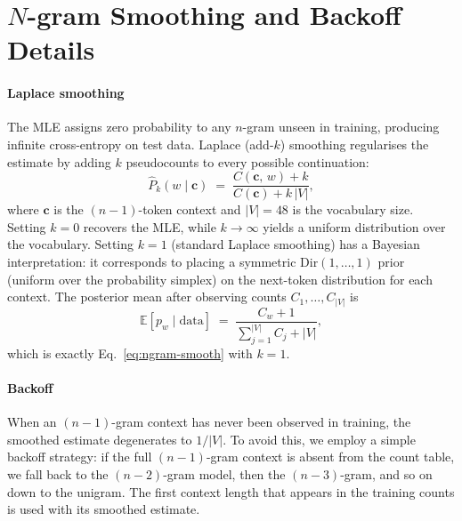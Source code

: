 \documentclass[11pt]{article}
\begin{document}
\appendix

\section{$N$-gram Smoothing and Backoff Details}\label{app:ngram-details}

\paragraph{Laplace smoothing}
The MLE assigns zero probability to any $n$-gram unseen in training,
producing infinite cross-entropy on test data.  Laplace (add-$k$)
smoothing regularises the estimate by adding $k$ pseudocounts to every
possible continuation:
\begin{equation}\label{eq:ngram-smooth}
  \hat{P}_{k}(w \mid \mathbf{c})
  \;=\; \frac{C(\mathbf{c},\, w) + k}
             {C(\mathbf{c}) + k\,|V|},
\end{equation}
where $\mathbf{c}$ is the $(n{-}1)$-token context and $|V| = 48$ is the
vocabulary size.  Setting $k = 0$ recovers the MLE, while
$k \to \infty$ yields a uniform distribution over the vocabulary.
Setting $k = 1$ (standard Laplace smoothing) has a
Bayesian interpretation: it corresponds to placing a symmetric
$\mathrm{Dir}(1,\dots,1)$ prior (uniform over the probability simplex)
on the next-token distribution for each context.  The posterior mean
after observing counts $C_1, \dots, C_{|V|}$ is
\begin{equation}
  \mathbb{E}[p_w \mid \text{data}]
  \;=\; \frac{C_w + 1}{\sum_{j=1}^{|V|} C_j + |V|},
\end{equation}
which is exactly Eq.~\eqref{eq:ngram-smooth} with $k = 1$.

\paragraph{Backoff}
When an $(n{-}1)$-gram context has never been observed in training, the
smoothed estimate degenerates to $1/|V|$.  To avoid this, we employ a
simple backoff strategy: if the full $(n{-}1)$-gram context is absent
from the count table, we fall back to the $(n{-}2)$-gram model, then
the $(n{-}3)$-gram, and so on down to the unigram.  The first context
length that appears in the training counts is used with its smoothed
estimate.
\end{document}
